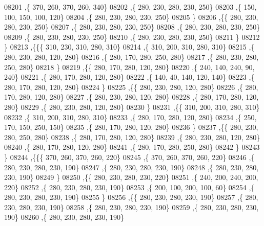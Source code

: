 \begin{DoxyCode}
08201     ,\{   370,   260,   370,   260,   340\}
08202     ,\{   280,   230,   280,   230,   250\}
08203     ,\{   150,   100,   150,   100,   120\}
08204     ,\{   280,   230,   280,   230,   250\}
08205     \}
08206    ,\{\{   280,   230,   280,   230,   250\}
08207     ,\{   280,   230,   280,   230,   250\}
08208     ,\{   280,   230,   280,   230,   250\}
08209     ,\{   280,   230,   280,   230,   250\}
08210     ,\{   280,   230,   280,   230,   250\}
08211     \}
08212    \}
08213   ,\{\{\{   310,   230,   310,   280,   310\}
08214     ,\{   310,   200,   310,   280,   310\}
08215     ,\{   280,   230,   280,   120,   280\}
08216     ,\{   280,   170,   280,   250,   280\}
08217     ,\{   280,   230,   280,   250,   280\}
08218     \}
08219    ,\{\{   280,   170,   280,   120,   280\}
08220     ,\{   240,   140,   240,    90,   240\}
08221     ,\{   280,   170,   280,   120,   280\}
08222     ,\{   140,    40,   140,   120,   140\}
08223     ,\{   280,   170,   280,   120,   280\}
08224     \}
08225    ,\{\{   280,   230,   280,   120,   280\}
08226     ,\{   280,   170,   280,   120,   280\}
08227     ,\{   280,   230,   280,   120,   280\}
08228     ,\{   280,   170,   280,   120,   280\}
08229     ,\{   280,   230,   280,   120,   280\}
08230     \}
08231    ,\{\{   310,   200,   310,   280,   310\}
08232     ,\{   310,   200,   310,   280,   310\}
08233     ,\{   280,   170,   280,   120,   280\}
08234     ,\{   250,   170,   150,   250,   150\}
08235     ,\{   280,   170,   280,   120,   280\}
08236     \}
08237    ,\{\{   280,   230,   280,   250,   280\}
08238     ,\{   280,   170,   280,   120,   280\}
08239     ,\{   280,   230,   280,   120,   280\}
08240     ,\{   280,   170,   280,   120,   280\}
08241     ,\{   280,   170,   280,   250,   280\}
08242     \}
08243    \}
08244   ,\{\{\{   370,   260,   370,   260,   220\}
08245     ,\{   370,   260,   370,   260,   220\}
08246     ,\{   280,   230,   280,   230,   190\}
08247     ,\{   280,   230,   280,   230,   190\}
08248     ,\{   280,   230,   280,   230,   190\}
08249     \}
08250    ,\{\{   280,   230,   280,   230,   220\}
08251     ,\{   240,   200,   240,   200,   220\}
08252     ,\{   280,   230,   280,   230,   190\}
08253     ,\{   200,   100,   200,   100,    60\}
08254     ,\{   280,   230,   280,   230,   190\}
08255     \}
08256    ,\{\{   280,   230,   280,   230,   190\}
08257     ,\{   280,   230,   280,   230,   190\}
08258     ,\{   280,   230,   280,   230,   190\}
08259     ,\{   280,   230,   280,   230,   190\}
08260     ,\{   280,   230,   280,   230,   190\}

\end{DoxyCode}
